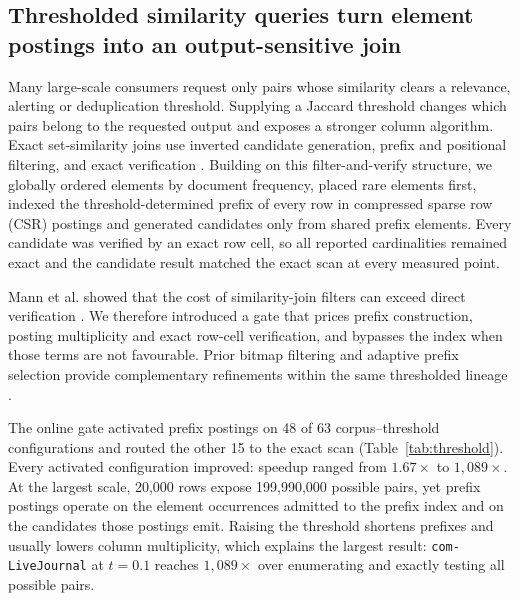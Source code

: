 \clearpage

\subsection*{Thresholded similarity queries turn element postings into an output-sensitive join}
\label{sec:r7}

Many large-scale consumers request only pairs whose similarity clears a relevance, alerting or
deduplication threshold. Supplying a Jaccard threshold changes which pairs belong to the requested
output and exposes a stronger column algorithm. Exact set-similarity joins use inverted candidate
generation, prefix and positional filtering, and exact verification
\cite{sarawagi2004setjoins,arasu2006exact,bayardo2007allpairs,xiao2011ppjoin}. Building on this
filter-and-verify structure, we globally ordered elements by document frequency,
placed rare elements first, indexed the threshold-determined prefix of every row in compressed sparse
row (CSR) postings and
generated candidates only from shared prefix elements. Every candidate was verified by an exact row
cell, so all reported cardinalities remained exact and the candidate result matched the exact scan
at every measured point.

Mann et al. showed that the cost of similarity-join filters can exceed direct verification
\cite{mann2016empirical}. We therefore introduced a gate that prices prefix construction, posting
multiplicity and exact row-cell verification, and bypasses the index when those terms are not
favourable. Prior bitmap filtering and adaptive prefix selection provide complementary refinements
within the same thresholded lineage \cite{sandes2020bitmapfilter,wang2012adaptjoin}.

The online gate activated prefix postings on 48 of 63 corpus--threshold configurations and routed
the other 15 to the exact scan (Table~\ref{tab:threshold}). Every activated configuration improved:
speedup ranged from $1.67\times$ to $1{,}089\times$. At the largest scale, 20,000 rows expose
199,990,000 possible pairs, yet prefix postings operate on the element occurrences admitted to the
prefix index and on the candidates those postings emit. Raising the threshold shortens prefixes and
usually lowers column multiplicity, which explains the largest result: \texttt{com-LiveJournal} at
$t=0.1$ reaches $1{,}089\times$ over enumerating and exactly testing all possible pairs.

